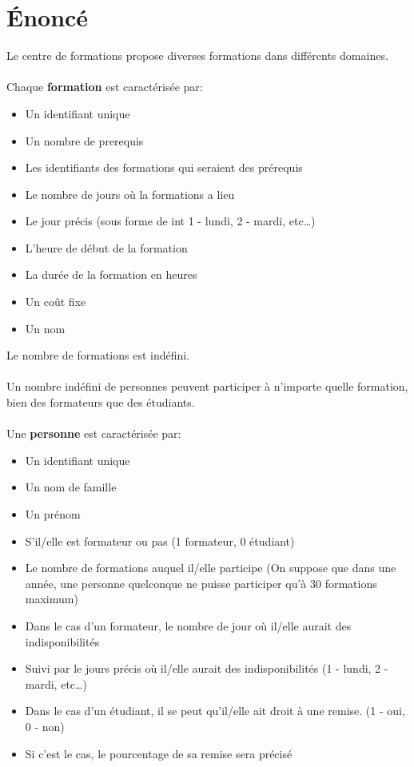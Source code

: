 \documentclass[11pt]{article}
\begin{document}
\newpage
\section{Énoncé}
Le centre de formations propose diverses formations dans différents domaines.\\\\
Chaque \textbf{formation} est caractérisée par:
\begin{itemize}
  \item Un identifiant unique
  \item Un nombre de prerequis
  \item Les identifiants des formations qui seraient des prérequis
  \item Le nombre de jours où la formations a lieu
  \item Le jour précis (sous forme de int 1 - lundi, 2 - mardi, etc\ldots)
  \item L'heure de début de la formation
  \item La durée de la formation en heures
  \item Un coût fixe
  \item Un nom
\end{itemize}
Le nombre de formations est indéfini.\\\\
Un nombre indéfini de personnes peuvent participer à n'importe quelle formation, bien des formateurs que des étudiants.\\\\
Une \textbf{personne} est caractérisée par:
\begin{itemize}
\item Un identifiant unique
\item Un nom de famille
\item Un prénom
\item S'il/elle est formateur ou pas (1 formateur, 0 étudiant)
\item Le nombre de formations auquel il/elle participe (On suppose que dans une année, une personne quelconque ne puisse participer qu'à 30 formations maximum)
\item Dans le cas d'un formateur, le nombre de jour où il/elle aurait des indisponibilités
\item Suivi par le jours précis où il/elle aurait des indisponibilités (1 - lundi, 2 - mardi, etc\ldots) 
\item Dans le cas d'un étudiant, il se peut qu'il/elle ait droit à une remise. (1 - oui, 0 - non)
\item Si c'est le cas, le pourcentage de sa remise sera précisé
\end{itemize}\leavevmode\newline
\end{document}
